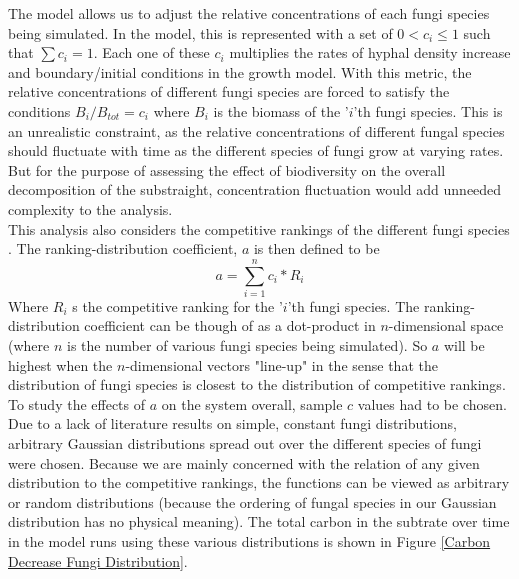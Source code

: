 \documentclass[12pt]{article}
\begin{document}
\begin{multicols}{2}
The model allows us to adjust the relative concentrations of each fungi species being simulated. In the model, this is represented with a set of $0<c_{i}\leq 1$ such that $\sum c_{i} = 1$. Each one of these $c_{i}$ multiplies the rates of hyphal density increase and boundary/initial conditions in the growth model. With this metric, the relative concentrations of different fungi species are forced to satisfy the conditions $B_{i}/B_{tot}=c_{i}$ where $B_{i}$ is the biomass of the '$i$'th fungi species. This is an unrealistic constraint, as the relative concentrations of different fungal species should fluctuate with time as the different species of fungi grow at varying rates. But for the purpose of assessing the effect of biodiversity on the overall decomposition of the substraight, concentration fluctuation would add unneeded complexity to the analysis. \\
This analysis also considers the competitive rankings of the different fungi species \cite{Maynard2019}. The ranking-distribution coefficient, $a$ is then defined to be
\begin{equation}
a = \sum_{i=1}^{n} c_{i}*R_{i}
\end{equation}
Where $R_{i}$ s the competitive ranking for the '$i$'th fungi species. The ranking-distribution coefficient can be though of as a dot-product in $n$-dimensional space (where $n$ is the number of various fungi species being simulated). So $a$ will be highest when the $n$-dimensional vectors "line-up" in the sense that the distribution of fungi species is closest to the distribution of competitive rankings.\\
To study the effects of $a$ on the system overall, sample $c$ values had to be chosen. Due to a lack of literature results on simple, constant fungi distributions, arbitrary Gaussian distributions spread out over the different species of fungi were chosen. Because we are mainly concerned with the relation of any given distribution to the competitive rankings, the functions can be viewed as arbitrary or random distributions (because the ordering of fungal species in our Gaussian distribution has no physical meaning). The total carbon in the subtrate over time in the model runs using these various distributions is shown in Figure \ref{Carbon Decrease Fungi Distribution}. 


\end{multicols}
\end{document}
